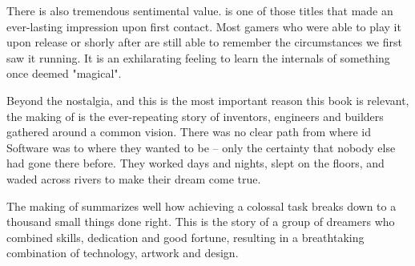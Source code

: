  \par
There is also tremendous sentimental value. \doom{} is one of those titles that made an ever-lasting impression upon first contact. Most gamers who were able to play it upon release or shorly after are still able to remember the circumstances we first saw it running. It is an exhilarating feeling to learn the internals of something once deemed "magical".\\
\par


Beyond the nostalgia, and this is the most important reason this book is relevant, the making of \doom{} is the ever-repeating story of inventors, engineers and builders gathered around a common vision. There was no clear path from where id Software was to where they wanted to be -- only the certainty that nobody else had gone there before. They worked days and nights, slept on the floors, and waded across rivers to make their dream come true.\\
\par
 The making of \doom{} summarizes well how achieving a colossal task breaks down to a thousand small things done right. This is the story of a group of dreamers who combined skills, dedication and good fortune, resulting in a breathtaking combination of technology, artwork and design.\\
\par



